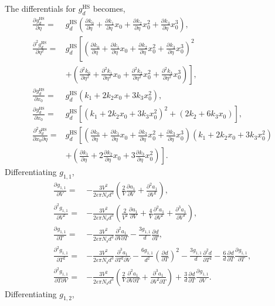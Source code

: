 \documentclass[english]{../thermomemo/thermomemo}
\newcommand*{\pd}[3][]{\frac{\partial^{#1}#2}{\partial{#3}^{#1}}}%
\newcommand*{\pdc}[3]{\frac{\partial^{2}#1}{\partial{#2}\partial{#3}}}%
\newcommand*{\pdcc}[3]{\frac{\partial^{3}#1}{\partial{#2}^{2}\partial{#3}}}%
\newcommand*{\lb}{\left(}
\newcommand*{\rb}{\right)}
\newcommand{\hs}{\text{HS}\xspace}
\newcommand{\seg}{\ensuremath{\text{s}}\xspace}
\begin{document}
The differentials for $g^\hs_d $ becomes,
\begin{align}
  \label{eq:g_hs_diff}
  \pd{g^\hs_d}{\eta} =& g^\hs_d \lb \pd{k_0}{\eta} + \pd{k_1}{\eta} x_0 + \pd{k_2}{\eta} x_0^2 + \pd{k_3}{\eta} x_0^3\rb,\\
  \pd[2]{g^\hs_d}{\eta} =& g^\hs_d \left[\lb \pd{k_0}{\eta} + \pd{k_1}{\eta} x_0 + \pd{k_2}{\eta} x_0^2 + \pd{k_3}{\eta} x_0^3\rb^2 \right. \nonumber \\ &\left. + \lb \pd[2]{k_0}{\eta} + \pd[2]{k_1}{\eta} x_0 + \pd[2]{k_2}{\eta} x_0^2 + \pd[2]{k_3}{\eta} x_0^3\rb \right],\\
  \pd{g^\hs_d}{x_0} =& g^\hs_d \lb k_1 + 2 k_2 x_0 + 3k_3 x_0^2\rb,\\
  \pd{g^\hs_d}{x_0} =& g^\hs_d \left[ \lb k_1 + 2 k_2 x_0 + 3k_3 x_0^2\rb^2 + \lb 2 k_2 + 6k_3 x_0\rb \right],\\
  \pdc{g^\hs_d}{x_0}{\eta} =& g^\hs_d \left[ \lb \pd{k_0}{\eta} + \pd{k_1}{\eta} x_0 + \pd{k_2}{\eta} x_0^2 + \pd{k_3}{\eta} x_0^3\rb\lb k_1 + 2 k_2 x_0 + 3k_3 x_0^2\rb \right. \nonumber \\ & \left. + \lb \pd{k_1}{\eta} + 2 \pd{k_2}{\eta} x_0 + 3\pd{k_3}{\eta} x_0^2\rb \right].
\end{align}
Differentiating $g_{1,1}$,
\begin{align}
  \label{eq:g_1_1_diff_V}
  \pd{g_{1,1}}{V}  =& -\frac{3 V^2}{2 \epsilon \pi N_\seg d^3} \lb \frac{2}{V} \pd{a_1}{V} +  \pd[2]{a_1}{V}\rb,\\
  \pd[2]{g_{1,1}}{V}  =& -\frac{3 V^2}{2 \epsilon \pi N_\seg d^3} \lb \frac{2}{V^2} \pd{a_1}{V} +  \frac{4}{V} \pd[2]{a_1}{V} +  \pd[3]{a_1}{V}\rb,\\
  \pd{g_{1,1}}{T}  =& -\frac{3 V^2}{2 \epsilon \pi N_\seg d^3} \pdc{a_1}{V}{T} - \frac{3 g_{1,1}}{d}\pd{d}{T},\\
  \pd[2]{g_{1,1}}{T}  =& -\frac{3 V^2}{2 \epsilon \pi N_\seg d^3} \pdcc{a_1}{T}{V} - \frac{6 g_{1,1}}{d^2}\lb \pd{d}{T} \rb^2 - \frac{3 g_{1,1}}{d} \pd[2]{d}{T} - \frac{6}{d} \pd{d}{T}\pd{g_{1,1}}{T} ,\\
  \pdc{g_{1,1}}{T}{V}  =& -\frac{3 V^2}{2 \epsilon \pi N_\seg d^3} \lb \frac{2}{V}\pdc{a_1}{V}{T} + \pdcc{a_1}{V}{T}\rb + \frac{3}{d}\pd{d}{T}\pd{g_{1,1}}{V}. \label{eq:g_1_1_diff_VT}
\end{align}
Differentiating $g_{1,2}$,
\end{document}
